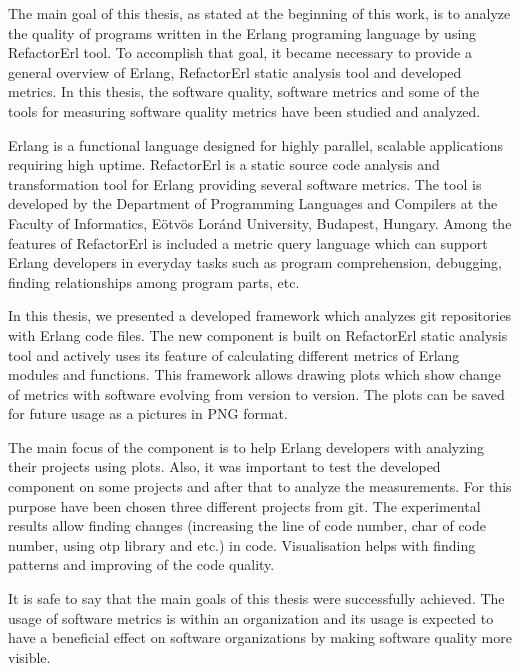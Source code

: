The main goal of this thesis, as stated at the beginning of this work, is to analyze the quality of programs written in the Erlang programing language by using RefactorErl tool. To accomplish that goal, it became necessary to provide a general overview of Erlang, RefactorErl static analysis tool and developed metrics. In this thesis, the software quality, software metrics and some of the tools for measuring software quality metrics have been studied and analyzed.

Erlang is a functional language designed for highly parallel, scalable applications requiring high uptime. RefactorErl is a static source code analysis and transformation tool for Erlang providing several software metrics. The tool is developed by the Department of Programming Languages and Compilers at the Faculty of Informatics, Eötvös Loránd University, Budapest, Hungary. Among the features of RefactorErl is included a metric query language which can support Erlang developers in everyday tasks such as program comprehension, debugging, finding relationships among program parts, etc.

In this thesis, we presented a developed framework which analyzes git repositories with Erlang code files. The new component is built on RefactorErl static analysis tool and actively uses its feature of calculating different metrics of Erlang modules and functions. This framework allows drawing plots which show change of metrics with software evolving from version to version. The plots can be saved for future usage as a pictures in PNG format. 

The main focus of the component is to help Erlang developers with analyzing their projects using plots. Also, it was important to test the developed component on some projects and after that to analyze the measurements. For this purpose have been chosen three different projects from git. The experimental results allow finding changes (increasing the line of code number, char of code number, using otp library and etc.) in code. Visualisation helps with finding patterns and improving of the code quality.

It is safe to say that the main goals of this thesis were successfully achieved. The usage of software metrics is within an organization and its usage is expected to have a beneficial effect on software organizations by making software quality more visible.